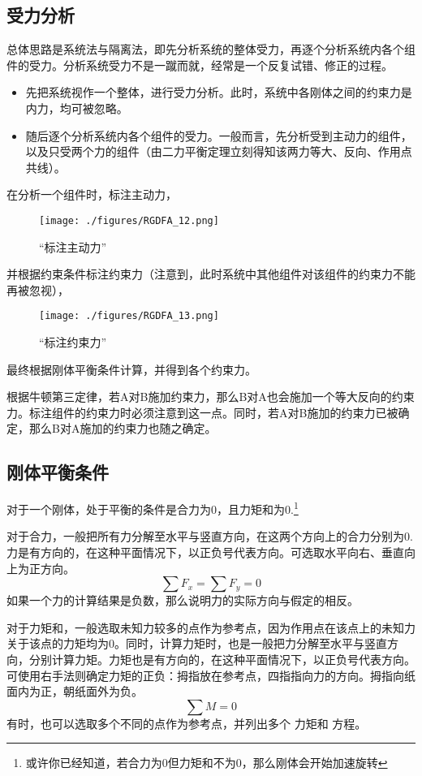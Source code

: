 \subsection{受力分析}
总体思路是系统法与隔离法，即先分析系统的整体受力，再逐个分析系统内各个组件的受力。分析系统受力不是一蹴而就，经常是一个反复试错、修正的过程。
\begin{itemize}
\item 先把系统视作一个整体，进行受力分析。此时，系统中各刚体之间的约束力是内力，均可被忽略。
\item 随后逐个分析系统内各个组件的受力。一般而言，先分析受到主动力的组件，以及只受两个力的组件（由二力平衡定理立刻得知该两力等大、反向、作用点共线）。
\end{itemize}

在分析一个组件时，标注主动力，
\begin{figure}[ht]
\centering
\texttt{[image: ./figures/RGDFA\_12.png]}
\caption{“标注主动力”} \label{RGDFA_fig12}
\end{figure}
并根据约束条件标注约束力（注意到，此时系统中其他组件对该组件的约束力不能再被忽视），
\begin{figure}[ht]
\centering
\texttt{[image: ./figures/RGDFA\_13.png]}
\caption{“标注约束力”} \label{RGDFA_fig13}
\end{figure}
最终根据刚体平衡条件计算，并得到各个约束力。

根据牛顿第三定律，若A对B施加约束力，那么B对A也会施加一个等大反向的约束力。标注组件的约束力时必须注意到这一点。同时，若A对B施加的约束力已被确定，那么B对A施加的约束力也随之确定。

\subsection{刚体平衡条件}\label{RGDFA_sub1}
对于一个刚体，处于平衡的条件是合力为0，且力矩和为0.\footnote{或许你已经知道，若合力为0但力矩和不为0，那么刚体会开始加速旋转}

对于合力，一般把所有力分解至水平与竖直方向，在这两个方向上的合力分别为0. 力是有方向的，在这种平面情况下，以正负号代表方向。可选取水平向右、垂直向上为正方向。
\begin{equation}
\sum F_x=\sum F_y=0
\end{equation}
如果一个力的计算结果是负数，那么说明力的实际方向与假定的相反。

对于力矩和，一般选取未知力较多的点作为参考点，因为作用点在该点上的未知力关于该点的力矩均为0。同时，计算力矩时，也是一般把力分解至水平与竖直方向，分别计算力矩。力矩也是有方向的，在这种平面情况下，以正负号代表方向。可使用右手法则确定力矩的正负：拇指放在参考点，四指指向力的方向。拇指向纸面内为正，朝纸面外为负。
\begin{equation}
\sum M=0
\end{equation}
有时，也可以选取多个不同的点作为参考点，并列出多个 力矩和 方程。


